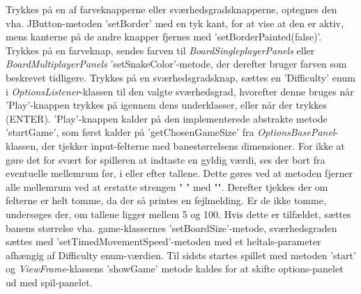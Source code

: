 Trykkes på en af farveknapperne eller sværhedsgradsknapperne, optegnes den vha. JButton-metoden 'setBorder' med en tyk kant, for at vise at den er aktiv, mens kanterne på de andre knapper fjernes med 'setBorderPainted(false)'. Trykkes på en farveknap, sendes farven til \textit{BoardSingleplayerPanels} eller \textit{BoardMultiplayerPanels} 'setSnakeColor'-metode, der derefter bruger farven som beskrevet tidligere. Trykkes på en sværhedsgradsknap, sættes  en 'Difficulty' enum i \textit{OptionsListener}-klassen til den valgte sværhedsgrad, hvorefter denne bruges når 'Play'-knappen trykkes på igennem dens underklasser, eller når der trykkes (ENTER). 'Play'-knappen kalder på den implementerede abstrakte metode 'startGame', som først kalder på 'getChosenGameSize' fra \textit{OptionsBasePanel}-klassen, der tjekker input-felterne med banestørrelsens dimensioner. For ikke at gøre det for svært for spilleren at indtaste en gyldig værdi, ses der bort fra eventuelle mellemrum før, i eller efter tallene. Dette gøres ved at metoden fjerner alle mellemrum ved at erstatte strengen " " med "". Derefter tjekkes der om felterne er helt tomme, da der så printes en fejlmelding. Er de ikke tomme, undersøges der, om tallene ligger mellem 5 og 100. Hvis dette er tilfældet, sættes banens størrelse vha. game-klassernes 'setBoardSize'-metode, sværhedsgraden sættes med 'setTimedMovementSpeed'-metoden med et heltals-parameter afhængig af Difficulty enum-værdien. Til sidsts startes spillet med metoden 'start' og \textit{ViewFrame}-klassens 'showGame' metode kaldes for at skifte options-panelet ud med spil-panelet.